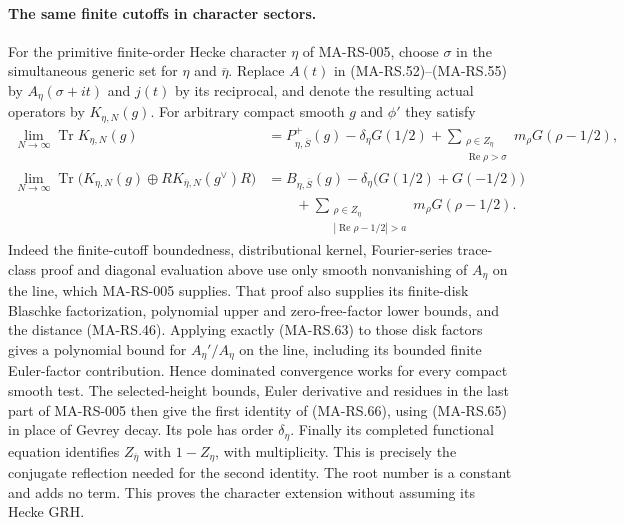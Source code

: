 \paragraph{The same finite cutoffs in character sectors.}
For the primitive finite-order Hecke character $\eta$ of
MA-RS-005, choose $\sigma$ in the simultaneous generic set
for $\eta$ and $\overline\eta$. Replace $A(t)$ in
(MA-RS.52)--(MA-RS.55) by
$A_\eta(\sigma+it)$ and $j(t)$ by its reciprocal, and denote
the resulting actual operators by $K_{\eta,N}(g)$.
For arbitrary compact smooth $g$ and $\phi'$ they satisfy
\[
 \begin{aligned}
 \lim_{N\to\infty}\operatorname{Tr}K_{\eta,N}(g)
  &=P^+_{\eta,\overline S}(g)-\delta_\eta G(1/2)
       +\sum_{\substack{\rho\in Z_\eta\\
                         \operatorname{Re}\rho>\sigma}}
                   m_\rho G(\rho-1/2),\\
 \lim_{N\to\infty}\operatorname{Tr}
   \bigl(K_{\eta,N}(g)\oplus
                R K_{\overline\eta,N}(g^\vee)R\bigr)
  &=B_{\eta,\overline S}(g)
         -\delta_\eta\bigl(G(1/2)+G(-1/2)\bigr)\\
  &\qquad +\sum_{\substack{\rho\in Z_\eta\\
                    |\operatorname{Re}\rho-1/2|>a}}
                       m_\rho G(\rho-1/2).
 \end{aligned}
 \tag{MA-RS.66}
\]
Indeed the finite-cutoff boundedness, distributional kernel,
Fourier-series trace-class proof and diagonal evaluation
above use only smooth nonvanishing of $A_\eta$ on the line,
which MA-RS-005 supplies. That proof also supplies its
finite-disk Blaschke factorization, polynomial upper and
zero-free-factor lower bounds, and the distance (MA-RS.46).
Applying exactly (MA-RS.63) to those disk factors gives
a polynomial bound for $A_\eta'/A_\eta$ on the line,
including its bounded finite Euler-factor contribution.
Hence dominated convergence works for every compact smooth
test. The selected-height bounds, Euler derivative and
residues in the last part of MA-RS-005 then give the first
identity of (MA-RS.66), using (MA-RS.65) in place of
Gevrey decay. Its pole has order $\delta_\eta$.
Finally its completed functional equation identifies
$Z_{\overline\eta}$ with $1-Z_\eta$, with multiplicity.
This is precisely the conjugate reflection needed for the
second identity. The root number is a constant and adds
no term. This proves the character extension without
assuming its Hecke GRH.

